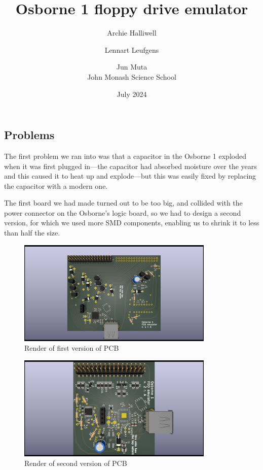 \documentclass[a4paper]{article}
\begin{document}
\title{Osborne 1 floppy drive emulator}
\date{July 2024}
\author{Archie Halliwell \and Lennart Leufgens \and Jun Muta \\
John Monash Science School}
\maketitle

\subsection{Problems}

The first problem we ran into was that a capacitor in the Osborne 1
exploded when it was first plugged in---the capacitor had absorbed
moisture over the years and this caused it to heat up and
explode---but this was easily fixed by replacing the capacitor with a
modern one.

The first board we had made turned out to be too big, and collided with
the power connector on the Osborne's logic board, so we had to design a second
version, for which we used more SMD components, enabling us to shrink
it to less than half the size.

\begin{figure}
  \centering
  \includegraphics[height=5cm]{pcb-v1}
  \caption{Render of first version of PCB}
\end{figure}

\begin{figure}
  \centering
  \includegraphics[height=5cm]{pcb-v2}
  \caption{Render of second version of PCB}
\end{figure}
\end{document}
